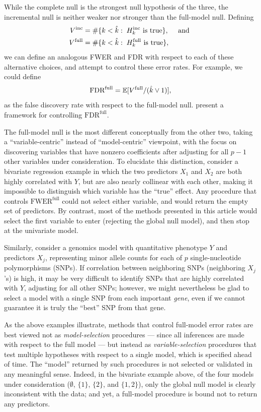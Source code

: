 \documentclass{article}
\begin{document}
While the complete null is the strongest null hypothesis of the three, the incremental null is neither weaker nor stronger than the full-model null. Defining 
\begin{align*}
V^{\text{inc}} &= \#\{k < \hat{k}:\; H_k^{\text{inc}} \text{ is true}\}, \quad \text{ and } \\
V^{\text{full}} &= \#\{k < \hat{k}:\; H_k^{\text{full}} \text{ is true}\},
\end{align*}
we can define an analogous FWER and FDR with respect to each of these alternative choices, and attempt to control these error rates. For example, we could define
\[
\text{FDR}^{\text{full}} = \mathbb{E}[V^{\text{full}} / (\hat{k} \vee 1)],
\]
as the false discovery rate with respect to the full-model null. \citet{barber2014controlling} present a framework for controlling $\text{FDR}^{\text{full}}$.

The full-model null is the most different conceptually from the other two, taking a ``variable-centric'' instead of ``model-centric'' viewpoint, with the focus on discovering variables that have nonzero coefficients after adjusting for all $p-1$ other variables under consideration. To elucidate this distinction, consider a bivariate regression example in which the two predictors $X_1$ and $X_2$ are both highly correlated with $Y$, but are also nearly collinear with each other, making it impossible to distinguish which variable has the ``true'' effect. Any procedure that controls $\text{FWER}^{\text{full}}$ could not select either variable, and would return the empty set of predictors. By contrast, most of the methods presented in this article would select the first variable to enter (rejecting the global null model), and then stop at the univariate model. 

Similarly, consider a genomics model with quantitative phenotype $Y$ and predictors $X_j$, representing minor allele counts for each of $p$ single-nucleotide polymorphisms (SNPs). If correlation between neighboring SNPs (neighboring $X_j$'s) is high, it may be very difficult to identify SNPs that are highly correlated with $Y$, adjusting for all other SNPs; however, we might nevertheless be glad to select a model with a single SNP from each important {\em gene}, even if we cannot guarantee it is truly the ``best'' SNP from that gene.

As the above examples illustrate, methods that control full-model error rates are best viewed not as {\em model-selection} procedures --- since all inferences are made with respect to the full model --- but instead as {\em variable-selection} procedures that test multiple hypotheses with respect to a single model, which is specified ahead of time. The ``model'' returned by such procedures is not selected or validated in any meaningful sense. Indeed, in the bivariate example above, of the four models under consideration ($\emptyset$, $\{1\}$, $\{2\}$, and $\{1,2\}$), only the global null model is clearly inconsistent with the data; and yet, a full-model procedure is bound not to return any predictors.
\end{document}
